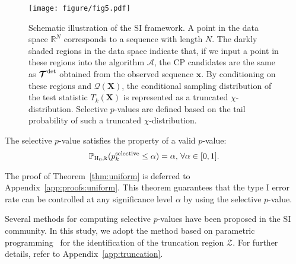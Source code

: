 \begin{figure}[H]
  \centering
  \texttt{[image: figure/fig5.pdf]}
  \caption{
  Schematic illustration of the SI framework.
  A point in the data space $\mathbb{R}^N$ corresponds to a sequence with length $N$.
  The darkly shaded regions in the data space indicate that, if we input a point in these regions into the algorithm $\mathcal{A}$, 
  the CP candidates are the same as $\bm{\mathcal{T}}^{\rm det}$ obtained from the observed sequence $\bm x$.
  By conditioning on these regions and $\mathcal{Q}(\bm{X})$, the conditional sampling distribution of the test statistic $T_k(\bm X)$ is represented as a truncated $\chi$-distribution. 
  Selective $p$-values are defined based on the tail probability of such a truncated $\chi$-distribution.
  }
  \label{fig5}
\end{figure}

\begin{theorem}
  \label{thm:uniform}
  The selective $p$-value satisfies the property of a valid $p$-value: 
  \begin{equation}
   \mathbb{P}_{\rm{H}_0,k} (p_k^{\rm{selective}}\leq\alpha) = \alpha, \, \forall \alpha \in [0, 1]. \notag
  \end{equation}
\end{theorem}
%
The proof of Theorem~\ref{thm:uniform} is deferred to Appendix~\ref{app:proofs:uniform}.
%
This theorem guarantees that the type I error rate can be controlled at any significance level $\alpha$ by using the selective $p$-value. 
%



Several methods for computing selective $p$-values have been proposed in the SI community. 
In this study, we adopt the method based on parametric programming~\citep{le2022more} 
for the identification of the truncation region $\mathcal{Z}$.
%
For further details, refer to Appendix~\ref{app:truncation}.


